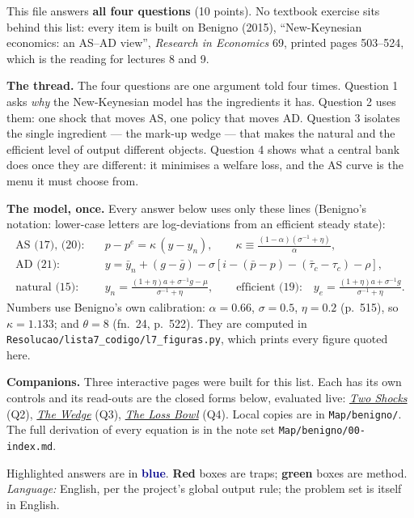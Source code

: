 \documentclass[11pt, a4paper]{article}
\newcommand{\resp}[1]{%
  \ifmmode {\color{darkblue}#1}\else\textcolor{darkblue}{\textbf{#1}}\fi}
\newcommand{\ybn}{\bar y_n}
\newcommand{\pbar}{\bar p}
\newcommand{\Sg}{\left(\sigma^{-1}+\eta\right)}
\newcommand{\urlshocks}{https://claude.ai/artifact/Hf8KsQYWvTwd6BnyFXP7MZ}
\newcommand{\urlwedge}{https://claude.ai/artifact/KUhe4SoMSCrZb5z7afiJ9U}
\newcommand{\urlloss}{https://claude.ai/artifact/5LYyfukdcNiBd3cHXvWH63}
\begin{document}
\begin{tcolorbox}[theorybox, title={How to read this document}]
\small
This file answers \textbf{all four questions} (10 points). No textbook exercise sits behind
this list: every item is built on Benigno (2015), ``New-Keynesian economics: an AS--AD
view'', \emph{Research in Economics} 69, printed pages 503--524, which is the reading for
lectures 8 and 9.

\smallskip
\textbf{The thread.} The four questions are one argument told four times.
Question 1 asks \emph{why} the New-Keynesian model has the ingredients it has. Question 2 uses
them: one shock that moves AS, one policy that moves AD. Question 3 isolates the single
ingredient --- the mark-up wedge --- that makes the natural and the efficient level of output
different objects. Question 4 shows what a central bank does once they are different: it
minimises a welfare loss, and the AS curve is the menu it must choose from.

\smallskip
\textbf{The model, once.} Every answer below uses only these lines (Benigno's notation:
lower-case letters are log-deviations from an efficient steady state):
\begin{align*}
\text{AS (17), (20):}\quad & p-p^e=\kappa\,(y-y_n),\qquad
  \kappa\equiv\frac{(1-\alpha)\Sg}{\alpha},\\
\text{AD (21):}\quad & y=\ybn+(g-\bar g)-\sigma\left[i-(\pbar-p)-(\bar\tau_c-\tau_c)-\rho\right],\\
\text{natural (15):}\quad & y_n=\frac{(1+\eta)a+\sigma^{-1}g-\mu}{\sigma^{-1}+\eta},
\qquad\text{efficient (19):}\quad y_e=\frac{(1+\eta)a+\sigma^{-1}g}{\sigma^{-1}+\eta}.
\end{align*}
Numbers use Benigno's own calibration: $\alpha=0.66$, $\sigma=0.5$, $\eta=0.2$ (p.~515), so
$\kappa=1.133$; and $\theta=8$ (fn.~24, p.~522). They are computed in
\texttt{Resolucao/lista7\_codigo/l7\_figuras.py}, which prints every figure quoted here.

\smallskip
\textbf{Companions.} Three interactive pages were built for this list. Each has its own
controls and its read-outs are the closed forms below, evaluated live:
\href{\urlshocks}{\emph{Two Shocks}} (Q2), \href{\urlwedge}{\emph{The Wedge}} (Q3),
\href{\urlloss}{\emph{The Loss Bowl}} (Q4). Local copies are in \texttt{Map/benigno/}.
The full derivation of every equation is in the note set \texttt{Map/benigno/00-index.md}.

\smallskip
Highlighted answers are in \resp{blue}. \textcolor{trapcolor}{\textbf{Red}} boxes are traps;
\textcolor{plancolor}{\textbf{green}} boxes are method. \emph{Language:} English, per the
project's global output rule; the problem set is itself in English.
\end{tcolorbox}
\end{document}
